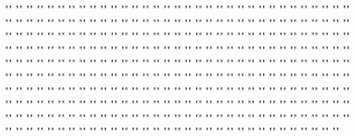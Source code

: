 ""	""	""	""	""	""	""
""	""	""	""	""	""	""
""	""	""	""	""	""	""
""	""	""	""	""	""	""
""	""	""	""	""	""	""
""	""	""	""	""	""	""
""	""	""	""	""	""	""
""	""	""	""	""	""	""
""	""	""	""	""	""	""
""	""	""	""	""	""	""
""	""	""	""	""	""	""
""	""	""	""	""	""	""
""	""	""	""	""	""	""
""	""	""	""	""	""	""
""	""	""	""	""	""	""
""	""	""	""	""	""	""
""	""	""	""	""	""	""
""	""	""	""	""	""	""
""	""	""	""	""	""	""
""	""	""	""	""	""	""
""	""	""	""	""	""	""
""	""	""	""	""	""	""
""	""	""	""	""	""	""
""	""	""	""	""	""	""
""	""	""	""	""	""	""
""	""	""	""	""	""	""
""	""	""	""	""	""	""
""	""	""	""	""	""	""
""	""	""	""	""	""	""
""	""	""	""	""	""	""
""	""	""	""	""	""	""
""	""	""	""	""	""	""
""	""	""	""	""	""	""
""	""	""	""	""	""	""
""	""	""	""	""	""	""
""	""	""	""	""	""	""
""	""	""	""	""	""	""
""	""	""	""	""	""	""
""	""	""	""	""	""	""
""	""	""	""	""	""	""
""	""	""	""	""	""	""
""	""	""	""	""	""	""
""	""	""	""	""	""	""
""	""	""	""	""	""	""
""	""	""	""	""	""	""
""	""	""	""	""	""	""
""	""	""	""	""	""	""

